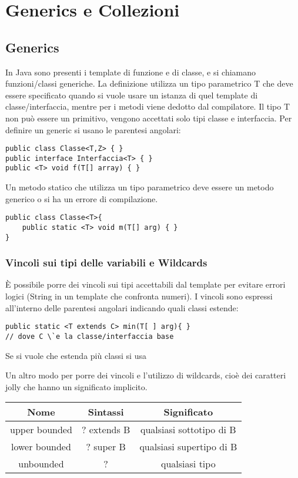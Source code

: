 \chapter{Generics e Collezioni}

\section{Generics}
In Java sono presenti i template di funzione e di classe, e si chiamano funzioni/classi generiche. La definizione utilizza un tipo parametrico T che deve essere specificato quando si vuole usare un istanza di quel template di classe/interfaccia, mentre per i metodi viene dedotto dal compilatore. Il tipo T non può essere un primitivo, vengono accettati solo tipi classe e interfaccia.
Per definire un generic si usano le parentesi angolari:
\begin{lstlisting}
public class Classe<T,Z> { }
public interface Interfaccia<T> { }
public <T> void f(T[] array) { }
\end{lstlisting}

Un metodo statico che utilizza un tipo parametrico deve essere un metodo generico o si ha un errore di compilazione. 
\begin{lstlisting}
public class Classe<T>{
	public static <T> void m(T[] arg) { }
}
\end{lstlisting}

\subsection*{Vincoli sui tipi delle variabili e Wildcards} %
È possibile porre dei vincoli sui tipi accettabili dal template per evitare errori logici (String in un template che confronta numeri). I vincoli sono espressi all'interno delle parentesi angolari indicando quali classi estende:

\begin{lstlisting}
public static <T extends C> min(T[ ] arg){ }
// dove C \`e la classe/interfaccia base
\end{lstlisting}

Se si vuole che estenda più classi si usa %

Un altro modo per porre dei vincoli e l'utilizzo di wildcards, cioè dei caratteri jolly che hanno un significato implicito.

\begin{table}
\centering
\begin{tabular}{|c|c|c|}
\hline
Nome & Sintassi & Significato \\
\hline
upper bounded & ? extends B & qualsiasi sottotipo di B \\
\hline
lower bounded & ? super B & qualsiasi supertipo di B \\
\hline
unbounded & ? & qualsiasi tipo \\
\hline
\end{tabular}
\end{table}

